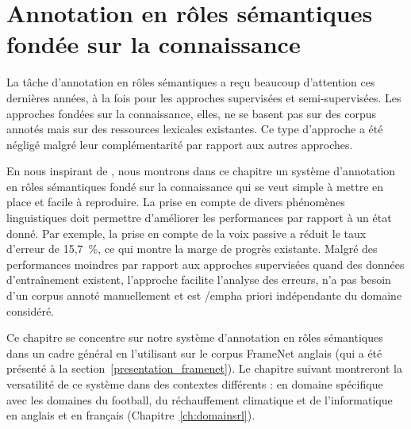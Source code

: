 \chapter{Annotation en rôles sémantiques fondée sur la connaissance}
\label{ch:srl}




La tâche d'annotation en rôles sémantiques a reçu beaucoup d'attention ces
dernières années, à la fois pour les approches supervisées et semi-supervisées.
Les approches fondées sur la connaissance, elles, ne se basent pas sur des
corpus annotés mais sur des ressources lexicales existantes. Ce type d'approche
a été négligé malgré leur complémentarité par rapport aux autres approches.

En nous inspirant de \citep{swier2004unsupervised,swier2005exploiting}, nous
montrons dans ce chapitre un système d'annotation en rôles sémantiques fondé
sur la connaissance qui se veut simple à mettre en place et facile à
reproduire. La prise en compte de divers phénomènes linguistiques doit
permettre d'améliorer les performances par rapport à un état donné. Par
exemple, la prise en compte de la voix passive a réduit le taux d'erreur de
15,7~\%, ce qui montre la marge de progrès existante. Malgré des performances
moindres par rapport aux approches supervisées quand des données d'entraînement
existent, l'approche facilite l'analyse des erreurs, n'a pas besoin d'un corpus
annoté manuellement et est /emph{a priori} indépendante du domaine considéré.

Ce chapitre se concentre sur notre système d'annotation en rôles sémantiques
dans un cadre général en l'utilisant sur le corpus FrameNet anglais (qui a été
présenté à la section~\ref{presentation_framenet}). Le chapitre suivant
montreront la versatilité de ce système dans des contextes différents : en
domaine spécifique avec les domaines du football, du réchauffement climatique
et de l'informatique en anglais et en français (Chapitre~\ref{ch:domainsrl}).

